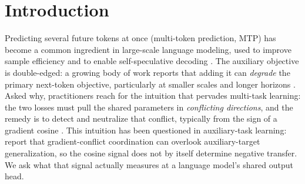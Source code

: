 \section{Introduction}
\label{sec:intro}

Predicting several future tokens at once (multi-token prediction, MTP) has
become a common ingredient in large-scale language modeling, used to improve
sample efficiency and to enable self-speculative decoding
\citep{gloeckle2024mtp,deepseekv3}. The auxiliary objective is double-edged: a
growing body of work reports that adding it can \emph{degrade} the primary
next-token objective, particularly at smaller scales and longer horizons
\citep{gloeckle2024mtp,zuhri2025top}. Asked why, practitioners reach for the
intuition that pervades multi-task learning: the two losses must pull the shared
parameters in \emph{conflicting directions}, and the remedy is to detect and
neutralize that conflict, typically from the sign of a gradient cosine
\citep{yu2020pcgrad,wang2021gradvaccine}. This intuition has been questioned in
auxiliary-task learning: \citet{jiang2023forkmerge} report that gradient-conflict
coordination can overlook auxiliary-target generalization, so the cosine signal
does not by itself determine negative transfer. We ask what that signal actually
measures at a language model's shared output head.

